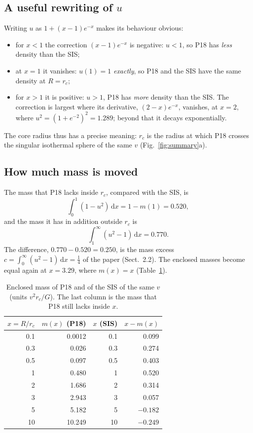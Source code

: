 \documentclass[11pt,a4paper]{article}
\newcommand{\rc}{r_c}
\newcommand{\dd}{\mathrm{d}}
\begin{document}
\subsection{A useful rewriting of $u$}
Writing $u$ as $1+(x-1)e^{-x}$ makes its behaviour obvious:
\begin{itemize}
\item for $x<1$ the correction $(x-1)e^{-x}$ is negative: $u<1$, so P18 has
  \emph{less} density than the SIS;
\item at $x=1$ it vanishes: $u(1)=1$ \emph{exactly}, so P18 and the SIS have the
  same density at $R=\rc$;
\item for $x>1$ it is positive: $u>1$, P18 has \emph{more} density than the SIS.
  The correction is largest where its derivative, $(2-x)e^{-x}$, vanishes, at $x=2$,
  where $u^2=(1+e^{-2})^2=1.289$; beyond that it decays exponentially.
\end{itemize}
The core radius thus has a precise meaning: $\rc$ is the radius at which P18
crosses the singular isothermal sphere of the same $v$ (Fig.~\ref{fig:summary}a).

\subsection{How much mass is moved}
The mass that P18 lacks inside $\rc$, compared with the SIS, is
\begin{equation}
  \int_0^1(1-u^2)\,\dd x=1-m(1)=0.520,
\end{equation}
and the mass it has in addition outside $\rc$ is
\begin{equation}
  \int_1^\infty(u^2-1)\,\dd x=0.770.
\end{equation}
The difference, $0.770-0.520=0.250$, is the mass excess $c=\int_0^\infty(u^2-1)\,
\dd x=\tfrac14$ of the paper (Sect.~2.2). The enclosed masses become equal again at
$x=3.29$, where $m(x)=x$ (Table~\ref{tab:mass}).

\begin{table}[h]
\centering\small
\caption{Enclosed mass of P18 and of the SIS of the same $v$ (units $v^2\rc/G$).
The last column is the mass that P18 still lacks inside $x$.}
\label{tab:mass}
\begin{tabular}{rrrr}
\toprule
$x=R/\rc$ & $m(x)$ (P18) & $x$ (SIS) & $x-m(x)$\\
\midrule
0.1 & 0.0012 & 0.1 & 0.099\\
0.3 & 0.026 & 0.3 & 0.274\\
0.5 & 0.097 & 0.5 & 0.403\\
1 & 0.480 & 1 & 0.520\\
2 & 1.686 & 2 & 0.314\\
3 & 2.943 & 3 & 0.057\\
5 & 5.182 & 5 & $-0.182$\\
10 & 10.249 & 10 & $-0.249$\\
\bottomrule
\end{tabular}
\end{table}
\end{document}
